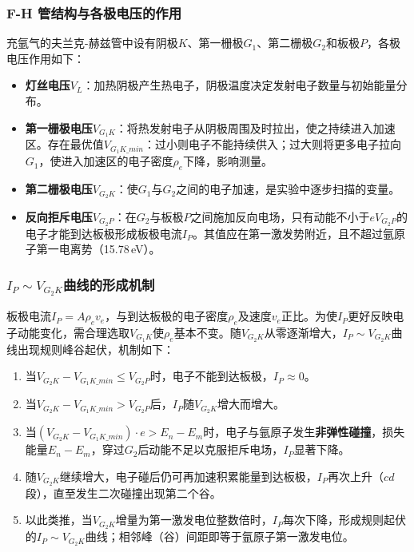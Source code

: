 \documentclass[dvipsnames, svgnames,a4paper,11pt]{article}
\begin{document}
\subsubsection{F-H 管结构与各极电压的作用}

充氩气的夫兰克-赫兹管中设有阴极$K$、第一栅极$G_1$、第二栅极$G_2$和板极$P$，各极电压作用如下：
\begin{itemize}
	\item \textbf{灯丝电压$V_L$}：加热阴极产生热电子，阴极温度决定发射电子数量与初始能量分布。
	\item \textbf{第一栅极电压$V_{G_1K}$}：将热发射电子从阴极周围及时拉出，使之持续进入加速区。存在最优值$V_{G_1K\_min}$：过小则电子不能持续供入；过大则将更多电子拉向$G_1$，使进入加速区的电子密度$\rho_e$下降，影响测量。
	\item \textbf{第二栅极电压$V_{G_2K}$}：使$G_1$与$G_2$之间的电子加速，是实验中逐步扫描的变量。
	\item \textbf{反向拒斥电压$V_{G_2P}$}：在$G_2$与板极$P$之间施加反向电场，只有动能不小于$eV_{G_2P}$的电子才能到达板极形成板极电流$I_P$。其值应在第一激发势附近，且不超过氩原子第一电离势（15.78\,eV）。
\end{itemize}

\subsubsection{$I_P \sim V_{G_2K}$曲线的形成机制}

板极电流$I_P = A\rho_e v_e$，与到达板极的电子密度$\rho_e$及速度$v_e$正比。为使$I_P$更好反映电子动能变化，需合理选取$V_{G_1K}$使$\rho_e$基本不变。随$V_{G_2K}$从零逐渐增大，$I_P\sim V_{G_2K}$曲线出现规则峰谷起伏，机制如下：
\begin{enumerate}
	\item 当$V_{G_2K} - V_{G_1K\_min} \leq V_{G_2P}$时，电子不能到达板极，$I_P \approx 0$。
	\item 当$V_{G_2K} - V_{G_1K\_min} > V_{G_2P}$后，$I_P$随$V_{G_2K}$增大而增大。
	\item 当$(V_{G_2K} - V_{G_1K\_min})\cdot e > E_n - E_m$时，电子与氩原子发生\textbf{非弹性碰撞}，损失能量$E_n-E_m$，穿过$G_2$后动能不足以克服拒斥电场，$I_P$显著下降。
	\item 随$V_{G_2K}$继续增大，电子碰后仍可再加速积累能量到达板极，$I_P$再次上升（$cd$段），直至发生二次碰撞出现第二个谷。
	\item 以此类推，当$V_{G_2K}$增量为第一激发电位整数倍时，$I_P$每次下降，形成规则起伏的$I_P\sim V_{G_2K}$曲线；相邻峰（谷）间距即等于氩原子第一激发电位。
\end{enumerate}
\end{document}
